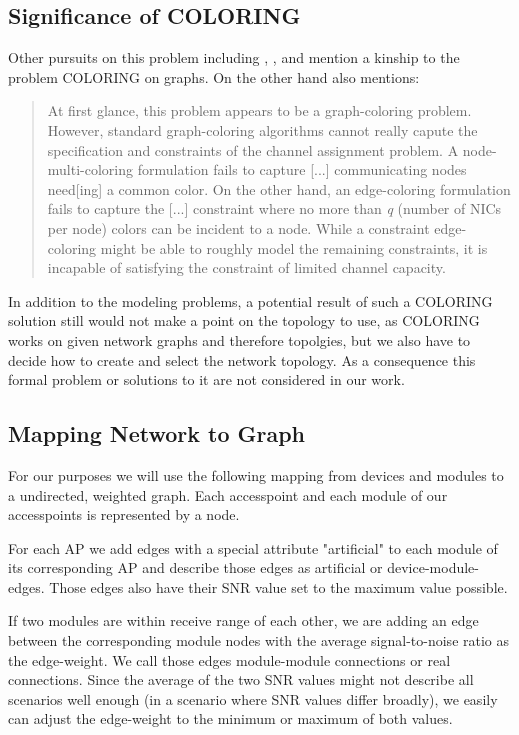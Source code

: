   \subsection{Significance of COLORING}
    Other pursuits on this problem including \cite{BFS-CA}, \cite{CTA}, \cite{caa_tricky} and \cite{katzela} mention a kinship to the problem COLORING on graphs.
    On the other hand \cite{caa_tricky} also mentions:
    
    \begin{quote}
      At first glance, this problem appears to be a graph-coloring problem. However, standard graph-coloring algorithms cannot really capute the specification and constraints 
      of the channel assignment problem. A node-multi-coloring formulation fails to capture [...] communicating nodes need[ing] a common color. On the other hand,
      an edge-coloring formulation fails to capture the [...] constraint where no more than \textit{q} (number of NICs per node) colors can be incident to a node.
      While a constraint edge-coloring might be able to roughly model the remaining constraints, it is incapable of satisfying the constraint of limited channel capacity.
    \end{quote}
    
    In addition to the modeling problems, a potential result of such a COLORING solution still would not make a point on the topology to use,
    as COLORING works on given network graphs and therefore topolgies, but we also have to decide how to create and select the network topology.
    As a consequence this formal problem or solutions to it are not considered in our work.
    
  \subsection{Mapping Network to Graph}
    For our purposes we will use the following mapping from devices and modules to a undirected, weighted graph.
    Each accesspoint and each module of our accesspoints is represented by a node.
    
    For each AP we add edges with a special attribute "artificial" 
    to each module of its corresponding AP and describe those edges as artificial or device-module-edges.
    Those edges also have their SNR value set to the maximum value possible. 
    
    If two modules are within receive range of each other, 
    we are adding an edge between the corresponding module nodes with the average signal-to-noise ratio as the edge-weight.
    We call those edges module-module connections or real connections.
    Since the average of the two SNR values might not describe all scenarios well enough (in a scenario where SNR values differ broadly),
    we easily can adjust the edge-weight to the minimum or maximum of both values.
    
